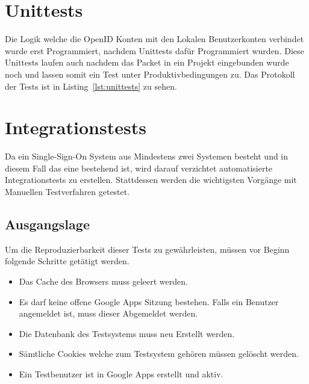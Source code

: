 
\section{Unittests}
\label{sec:unittests}
Die Logik welche die OpenID Konten mit den Lokalen Benutzerkonten verbindet wurde erst Programmiert, nachdem Unittests dafür Programmiert wurden. Diese Unittests laufen auch nachdem das Packet in ein Projekt eingebunden wurde noch und lassen somit ein Test unter Produktivbedingungen zu. Das Protokoll der Tests ist in Listing~\ref{lst:unittests} zu sehen.

{\minipage{\linewidth}
  
\endminipage}

\section{Integrationstests}
\label{sec:integrationstests}
Da ein Single-Sign-On System aus Mindestens zwei Systemen besteht und in diesem Fall das eine bestehend ist, wird darauf verzichtet automatisierte Integrationstests zu erstellen. Stattdessen werden die wichtigsten Vorgänge mit Manuellen Testverfahren getestet.

\subsection{Ausgangslage}
\label{sub:TestingAusgangslage}
Um die Reproduzierbarkeit dieser Tests zu gewährleisten, müssen vor Beginn folgende Schritte getätigt werden.

\begin{itemize}
    \item Das Cache des Browsers muss geleert werden.
    \item Es darf keine offene Google Apps Sitzung bestehen. Falls ein Benutzer
          angemeldet ist, muss dieser Abgemeldet werden.
    \item Die Datenbank des Testsystems muss neu Erstellt werden.
    \item Sämtliche Cookies welche zum Testsystem gehören müssen gelöscht
          werden.
    \item Ein Testbenutzer ist in Google Apps erstellt und aktiv.
\end{itemize}

